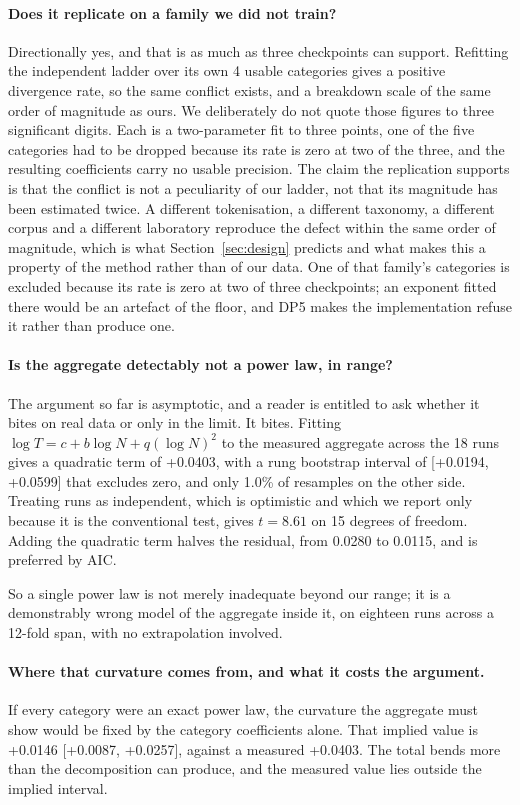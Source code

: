 \documentclass[11pt]{article}
\begin{document}
\paragraph{Does it replicate on a family we did not train?}
Directionally yes, and that is as much as three checkpoints can support. Refitting
the independent ladder over its own 4 usable categories gives a
positive divergence rate, so the same conflict exists, and a breakdown scale of the
same order of magnitude as ours. We deliberately do not quote those figures to three
significant digits. Each is a two-parameter fit to three points, one of the five
categories had to be dropped because its rate is zero at two of the three, and the
resulting coefficients carry no usable precision. The claim the replication supports
is that the conflict is not a peculiarity of our ladder, not that its magnitude has
been estimated twice. A different tokenisation, a different taxonomy, a
different corpus and a different laboratory reproduce the defect within the same
order of magnitude, which is what Section~\ref{sec:design} predicts and what makes
this a property of the method rather than of our data. One of that family's
categories is excluded because its rate is zero at two of three checkpoints; an
exponent fitted there would be an artefact of the floor, and DP5 makes the
implementation refuse it rather than produce one.

\paragraph{Is the aggregate detectably not a power law, in range?}
The argument so far is asymptotic, and a reader is entitled to ask whether it bites
on real data or only in the limit. It bites. Fitting
$\log T = c + b \log N + q (\log N)^2$ to the measured aggregate across the
18 runs gives a quadratic term of +0.0403, with a rung bootstrap
interval of [+0.0194, +0.0599] that excludes zero, and only
1.0\% of resamples on the other side. Treating runs as independent,
which is optimistic and which we report only because it is the conventional test,
gives $t = 8.61$ on 15 degrees of freedom. Adding the
quadratic term halves the residual, from 0.0280 to
0.0115, and is preferred by AIC.

So a single power law is not merely inadequate beyond our range; it is a
demonstrably wrong model of the aggregate inside it, on eighteen runs across a
12-fold span, with no extrapolation involved.

\paragraph{Where that curvature comes from, and what it costs the argument.}
If every category were an exact power law, the curvature the aggregate must show
would be fixed by the category coefficients alone. That implied value is
+0.0146 [+0.0087, +0.0257], against a
measured +0.0403. The total bends more than the decomposition can
produce, and the measured value lies outside the implied interval.
\end{document}
